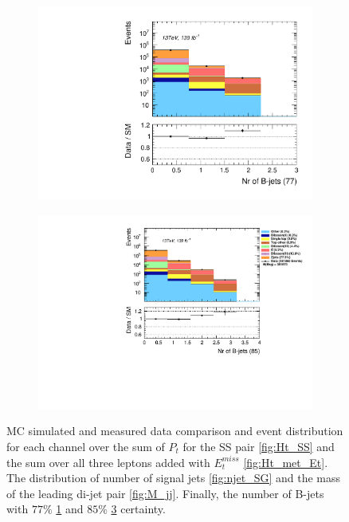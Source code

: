 \begin{figure}[H]
{\begin{subfigure}{.405\textwidth}
        \includegraphics[width=\textwidth]{Figures/FeaturesHistograms/nbjet77.pdf}
        \caption{}
        \label{fig:nbjet77}
    \end{subfigure}
    \hfill
    \begin{subfigure}{.525\textwidth}
        \includegraphics[width=\textwidth]{Figures/FeaturesHistograms/nbjet85.pdf}
        \caption{}
        \label{fig:nbjet85}
    \end{subfigure}
    }
    \caption[\acs{MC} simulated and measured data comparison and event distribution for each channel over the sum of $P_t$
    for the SS pair and the sum over all three leptons added with $E_t^{miss}$. The distribution of number of 
    signal jets and the mass of the leading di-jet pair. Finally, the number of B-jets with $77\%$ and $85\%$ 
    certainty.]{\acs{MC} simulated and measured data comparison and event distribution for each channel over the sum of $P_t$
    for the SS pair \ref{fig:Ht_SS} and the sum over all three leptons added with $E_t^{miss}$
    \ref{fig:Ht_met_Et}. The distribution of number of signal jets \ref{fig:njet_SG} and the mass 
    of the leading di-jet pair \ref{fig:M_jj}. Finally, the number of B-jets with $77\%$ \ref{fig:nbjet77} and $85\%$ 
    \ref{fig:nbjet85} certainty.}
\end{figure}
